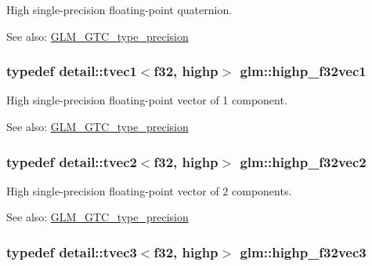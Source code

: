 High single-precision floating-point quaternion. \begin{Desc}
\item[See also:]\hyperlink{group__gtc__type__precision}{GLM\_\-GTC\_\-type\_\-precision} \end{Desc}
\hypertarget{group__gtc__type__precision_gc8be8ce31b9df0a5005d7c7458a3d03e}{
\subsubsection[highp\_\-f32vec1]{\setlength{\rightskip}{0pt plus 5cm}typedef detail::tvec1$<$f32, highp$>$ {\bf glm::highp\_\-f32vec1}}}
\label{group__gtc__type__precision_gc8be8ce31b9df0a5005d7c7458a3d03e}


High single-precision floating-point vector of 1 component. \begin{Desc}
\item[See also:]\hyperlink{group__gtc__type__precision}{GLM\_\-GTC\_\-type\_\-precision} \end{Desc}
\hypertarget{group__gtc__type__precision_gbba3e1b3ae0bcaa7aaac573c08c2f8d3}{
\subsubsection[highp\_\-f32vec2]{\setlength{\rightskip}{0pt plus 5cm}typedef detail::tvec2$<$f32, highp$>$ {\bf glm::highp\_\-f32vec2}}}
\label{group__gtc__type__precision_gbba3e1b3ae0bcaa7aaac573c08c2f8d3}


High single-precision floating-point vector of 2 components. \begin{Desc}
\item[See also:]\hyperlink{group__gtc__type__precision}{GLM\_\-GTC\_\-type\_\-precision} \end{Desc}
\hypertarget{group__gtc__type__precision_g581a4a4eb1f3a269d16af0c4e2d8daf4}{
\subsubsection[highp\_\-f32vec3]{\setlength{\rightskip}{0pt plus 5cm}typedef detail::tvec3$<$f32, highp$>$ {\bf glm::highp\_\-f32vec3}}}
\label{group__gtc__type__precision_g581a4a4eb1f3a269d16af0c4e2d8daf4}


